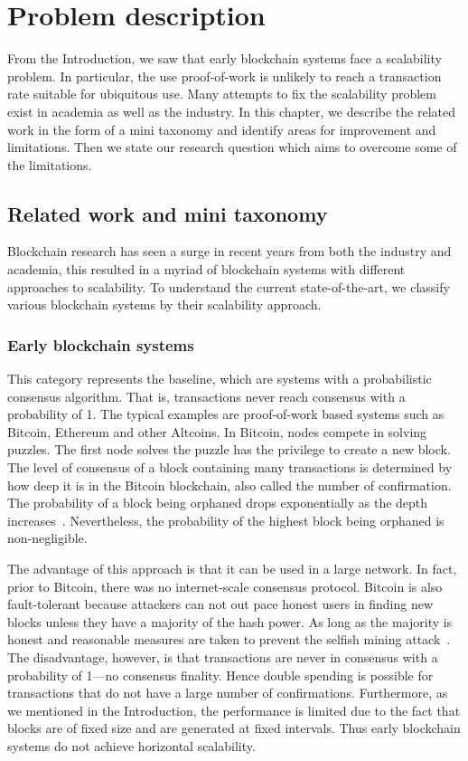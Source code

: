 \chapter{Problem description}
\label{ch:problem}

From the Introduction, we saw that early blockchain systems face a scalability problem.
In particular, the use proof-of-work is unlikely to reach a transaction rate suitable for ubiquitous use.
Many attempts to fix the scalability problem exist in academia as well as the industry.
In this chapter, we describe the related work in the form of a mini taxonomy and identify areas for improvement and limitations.
Then we state our research question which aims to overcome some of the limitations.

\section{Related work and mini taxonomy}
\label{sec:taxonomy}

Blockchain research has seen a surge in recent years from both the industry and academia,
this resulted in a myriad of blockchain systems with different approaches to scalability.
To understand the current state-of-the-art,
we classify various blockchain systems by their scalability approach.

\subsection{Early blockchain systems}
This category represents the baseline,
which are systems with a probabilistic consensus algorithm.
That is, transactions never reach consensus with a probability of 1.
The typical examples are proof-of-work based systems such as Bitcoin, Ethereum and other Altcoins.
In Bitcoin, nodes compete in solving puzzles.
The first node solves the puzzle has the privilege to create a new block.
The level of consensus of a block containing many transactions is determined by how deep it is in the Bitcoin blockchain,
also called the number of confirmation.
The probability of a block being orphaned drops exponentially as the depth increases~\cite{bitcoin}.
Nevertheless, the probability of the highest block being orphaned is non-negligible.

The advantage of this approach is that it can be used in a large network.
In fact, prior to Bitcoin, there was no internet-scale consensus protocol.
Bitcoin is also fault-tolerant because attackers can not out pace honest users in finding new blocks unless they have a majority of the hash power.
As long as the majority is honest and reasonable measures are taken to prevent the selfish mining attack~\cite{eyal2014majority}.
The disadvantage, however, is that transactions are never in consensus with a probability of 1---no consensus finality.
Hence double spending is possible for transactions that do not have a large number of confirmations.
Furthermore, as we mentioned in the Introduction,
the performance is limited due to the fact that blocks are of fixed size and are generated at fixed intervals.
Thus early blockchain systems do not achieve horizontal scalability.

